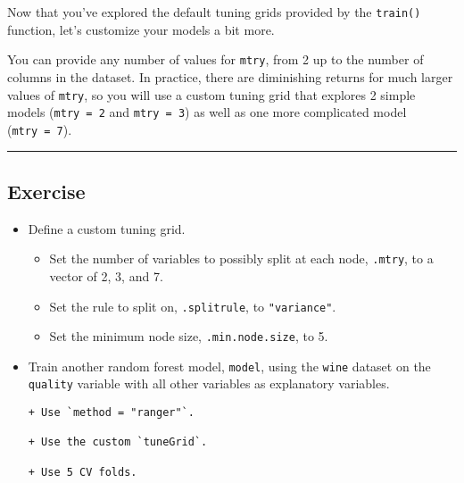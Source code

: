 \documentclass[
]{book}
\begin{document}
Now that you've explored the default tuning grids provided by the \texttt{train()} function, let's customize your models a bit more.

You can provide any number of values for \texttt{mtry}, from 2 up to the number of columns in the dataset. In practice, there are diminishing returns for much larger values of \texttt{mtry}, so you will use a custom tuning grid that explores 2 simple models (\texttt{mtry\ =\ 2} and \texttt{mtry\ =\ 3}) as well as one more complicated model (\texttt{mtry\ =\ 7}).

\begin{center}\rule{0.5\linewidth}{0.5pt}\end{center}

\hypertarget{exercise-19}{%
\subsection*{Exercise}\label{exercise-19}}

\begin{itemize}
\item
  Define a custom tuning grid.

  \begin{itemize}
  \item
    Set the number of variables to possibly split at each node, \texttt{.mtry}, to a vector of 2, 3, and 7.
  \item
    Set the rule to split on, \texttt{.splitrule}, to \texttt{"variance"}.
  \item
    Set the minimum node size, \texttt{.min.node.size}, to 5.
  \end{itemize}
\item
  Train another random forest model, \texttt{model}, using the \texttt{wine} dataset on the \texttt{quality} variable with all other variables as explanatory variables.

\begin{verbatim}
+ Use `method = "ranger"`.

+ Use the custom `tuneGrid`.

+ Use 5 CV folds.
\end{verbatim}
\end{itemize}
\end{document}
